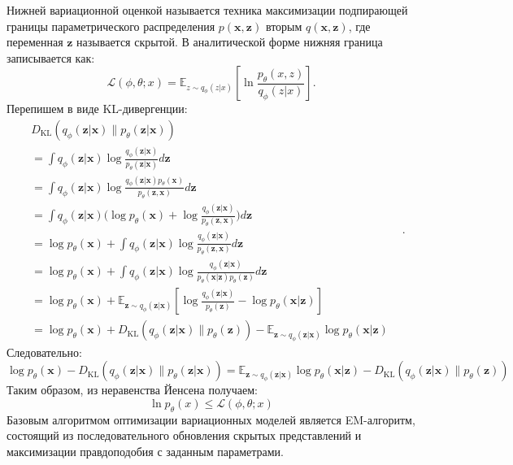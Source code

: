 Нижней вариационной оценкой называется техника максимизации подпирающей границы параметрического распределения $p(\mathbf{x},\mathbf{z})$ вторым $q(\mathbf{x},\mathbf{z})$,
где переменная $\mathbf{z}$ называется скрытой. В аналитической форме нижняя граница записывается как:
\begin{equation}
    \mathcal{L}(\phi,\theta;x) = \mathbb{E}_{z \sim q_\phi(z|x)} \left[\ln \frac{p_{\theta}(x,z)}{q_{\phi}(z|x)}\right].
\end{equation}
Перепишем в виде KL-дивергенции:
\begin{equation}
    \begin{aligned}
        & D_\text{KL}( q_\phi(\mathbf{z}\vert\mathbf{x}) \| p_\theta(\mathbf{z}\vert\mathbf{x}) ) & \\
        &=\int q_\phi(\mathbf{z} \vert \mathbf{x}) \log\frac{q_\phi(\mathbf{z} \vert \mathbf{x})}{p_\theta(\mathbf{z} \vert \mathbf{x})} d\mathbf{z} & \\
        &=\int q_\phi(\mathbf{z} \vert \mathbf{x}) \log\frac{q_\phi(\mathbf{z} \vert \mathbf{x})p_\theta(\mathbf{x})}{p_\theta(\mathbf{z}, \mathbf{x})} d\mathbf{z}\\
        &=\int q_\phi(\mathbf{z} \vert \mathbf{x}) \big( \log p_\theta(\mathbf{x}) + \log\frac{q_\phi(\mathbf{z} \vert \mathbf{x})}{p_\theta(\mathbf{z}, \mathbf{x})} \big) d\mathbf{z} & \\
        &=\log p_\theta(\mathbf{x}) + \int q_\phi(\mathbf{z} \vert \mathbf{x})\log\frac{q_\phi(\mathbf{z} \vert \mathbf{x})}{p_\theta(\mathbf{z}, \mathbf{x})} d\mathbf{z} \\
        &=\log p_\theta(\mathbf{x}) + \int q_\phi(\mathbf{z} \vert \mathbf{x})\log\frac{q_\phi(\mathbf{z} \vert \mathbf{x})}{p_\theta(\mathbf{x}\vert\mathbf{z})p_\theta(\mathbf{z})} d\mathbf{z} \\
        &=\log p_\theta(\mathbf{x}) + \mathbb{E}_{\mathbf{z}\sim q_\phi(\mathbf{z} \vert \mathbf{x})}[\log \frac{q_\phi(\mathbf{z} \vert \mathbf{x})}{p_\theta(\mathbf{z})} - \log p_\theta(\mathbf{x} \vert \mathbf{z})] &\\
        &=\log p_\theta(\mathbf{x}) + D_\text{KL}(q_\phi(\mathbf{z}\vert\mathbf{x}) \| p_\theta(\mathbf{z})) - \mathbb{E}_{\mathbf{z}\sim q_\phi(\mathbf{z}\vert\mathbf{x})}\log p_\theta(\mathbf{x}\vert\mathbf{z}) &
    \end{aligned}.
\end{equation}
Следовательно:
\begin{equation}
    \log p_\theta(\mathbf{x}) - D_\text{KL}( q_\phi(\mathbf{z}\vert\mathbf{x}) \| p_\theta(\mathbf{z}\vert\mathbf{x}) ) = \mathbb{E}_{\mathbf{z}\sim q_\phi(\mathbf{z}\vert\mathbf{x})}\log p_\theta(\mathbf{x}\vert\mathbf{z}) - D_\text{KL}(q_\phi(\mathbf{z}\vert\mathbf{x}) \| p_\theta(\mathbf{z}))
\end{equation}
Таким образом, из неравенства Йенсена получаем: 
$$
    \ln p_\theta(x) \le \mathcal{L}(\phi,\theta;x)
$$
Базовым алгоритмом оптимизации вариационных моделей является EM-алгоритм, состоящий из последовательного обновления
скрытых представлений и максимизации правдоподобия с заданным параметрами.

